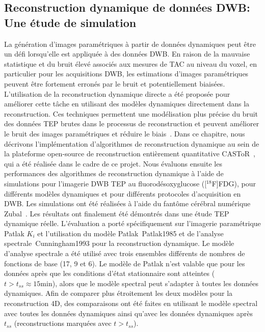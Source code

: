 \subsection*{Reconstruction dynamique de données DWB: Une étude de simulation}
La génération d'images paramétriques à partir de données dynamiques peut être un défi lorsqu'elle est appliquée à des données DWB.
En raison de la mauvaise statistique et du bruit élevé associés aux mesures de TAC au niveau du voxel, en particulier pour les acquisitions DWB, les estimations d'images paramétriques peuvent être fortement erronés par le bruit et potentiellement biaisées. 
L'utilisation de la reconstruction dynamique directe a été proposée pour améliorer cette tâche en utilisant des modèles dynamiques directement dans la reconstruction. Ces techniques permettent une modélisation plus précise du bruit des données TEP brutes dans le processus de reconstruction et peuvent améliorer le bruit des images paramétriques et réduire le biais~\cite{Reader2014}. 
Dans ce chapitre, nous décrivons l'implémentation d'algorithmes de reconstruction dynamique au sein de la plateforme open-source de reconstruction entièrement quantitative CASToR~\cite{Merlin2018}, qui a été réalisée dans le cadre de ce projet. Nous évaluons ensuite les performances des algorithmes de reconstruction dynamique à l'aide de simulations pour l'imagerie DWB TEP au fluorodésoxyglucose ([$^{18}$F]FDG), pour différents modèles dynamiques et pour différents protocoles d'acquisition en DWB. Les simulations ont été réalisées à l'aide du fantôme cérébral numérique Zubal~\cite{Zubal1994}. Les résultats ont finalement été démontrés dans une étude TEP dynamique réelle.
L'évaluation a porté spécifiquement sur l'imagerie paramétrique Patlak $K_i$ et l'utilisation du modèle Patlak~{Patlak1985} et de l'analyse spectrale~{Cunningham1993} pour la reconstruction dynamique. Le modèle d'analyse spectrale a été utilisé avec trois ensembles différents de nombres de fonctions de base (17, 9 et 6). Le modèle de Patlak n'est valable que pour les données après que les conditions d'état stationnaire sont atteintes ($t>t_{ss}\approx\mathrm{15 min}$), alors que le modèle spectral peut s'adapter à toutes les données dynamiques. Afin de comparer plus étroitement les deux modèles pour la reconstruction 4D, des comparaisons ont été faites en utilisant le modèle spectral avec toutes les données dynamiques ainsi qu'avec les données dynamiques après $t_{ss}$ (reconstructions marquées avec $t > t_{ss}$).

